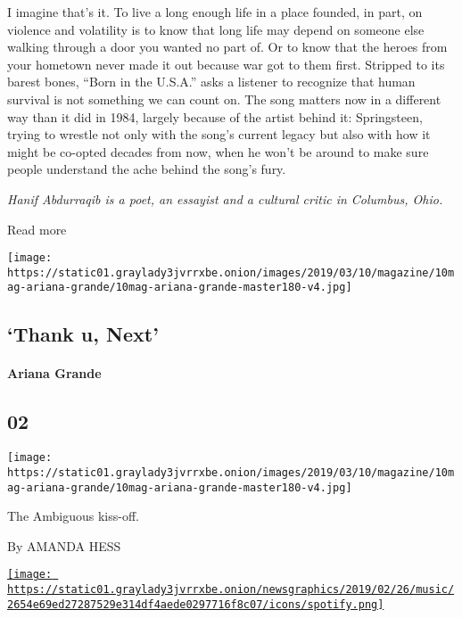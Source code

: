 I imagine that's it. To live a long enough life in a place founded, in
part, on violence and volatility is to know that long life may depend on
someone else walking through a door you wanted no part of. Or to know
that the heroes from your hometown never made it out because war got to
them first. Stripped to its barest bones, ``Born in the U.S.A.'' asks a
listener to recognize that human survival is not something we can count
on. The song matters now in a different way than it did in 1984, largely
because of the artist behind it: Springsteen, trying to wrestle not only
with the song's current legacy but also with how it might be co-opted
decades from now, when he won't be around to make sure people understand
the ache behind the song's fury.

\emph{Hanif Abdurraqib is a poet, an essayist and a cultural critic in
Columbus, Ohio.}

Read more

\texttt{[image: https://static01.graylady3jvrrxbe.onion/images/2019/03/10/magazine/10mag-ariana-grande/10mag-ariana-grande-master180-v4.jpg]}

\hypertarget{--thank-u-next}{%
\subsection{\texorpdfstring{ `Thank u,
Next'}{  `Thank u, Next'}}\label{--thank-u-next}}

\hypertarget{ariana-grande}{%
\paragraph{Ariana Grande}\label{ariana-grande}}

\hypertarget{02}{%
\subsection{02}\label{02}}

\texttt{[image: https://static01.graylady3jvrrxbe.onion/images/2019/03/10/magazine/10mag-ariana-grande/10mag-ariana-grande-master180-v4.jpg]}

The Ambiguous kiss-off.

By AMANDA HESS

\href{https://open.spotify.com/track/3e9HZxeyfWwjeyPAMmWSSQ}{\texttt{[image: https://static01.graylady3jvrrxbe.onion/newsgraphics/2019/02/26/music/2654e69ed27287529e314df4aede0297716f8c07/icons/spotify.png]}}

